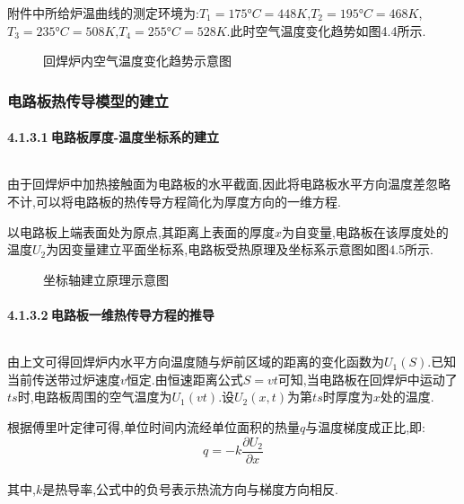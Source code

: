 \documentclass[12pt]{ctexart}
\numberwithin{figure}{section}
\numberwithin{table}{section}
\begin{document}
附件中所给炉温曲线的测定环境为:$T_1=175°C=448K$,$T_2=195°C=468K$,$T_3=235°C=508K$,$T_4=255°C=528K$.此时空气温度变化趋势如图4.4所示.
\begin{figure}[!htp]
\centering
{}
\quad
{}
\caption{回焊炉内空气温度变化趋势示意图}
\end{figure}

\subsubsection{电路板热传导模型的建立}

\paragraph{4.1.3.1$\ $电路板厚度-温度坐标系的建立}$\ $

由于回焊炉中加热接触面为电路板的水平截面,因此将电路板水平方向温度差忽略不计,可以将电路板的热传导方程简化为厚度方向的一维方程.

以电路板上端表面处为原点,其距离上表面的厚度$x$为自变量,电路板在该厚度处的温度$U_2$为因变量建立平面坐标系,电路板受热原理及坐标系示意图如图4.5所示.
\begin{figure}[!htp]
\centering
{}
\quad
{}
\caption{坐标轴建立原理示意图}
\end{figure}

\paragraph{4.1.3.2$\ $电路板一维热传导方程的推导}$\ $

由上文可得回焊炉内水平方向温度随与炉前区域的距离的变化函数为$U_1(S)$.已知当前传送带过炉速度$v$恒定.由恒速距离公式$S=vt$可知,当电路板在回焊炉中运动了$ts$时,电路板周围的空气温度为$U_1(vt)$.设$U_2(x,t)$为第$ts$时厚度为$x$处的温度.

根据傅里叶定律可得,单位时间内流经单位面积的热量$q$与温度梯度成正比,即:
\begin{equation}
q=-k\frac{\partial U_2}{\partial x}
\end{equation}\\
其中,$k$是热导率,公式中的负号表示热流方向与梯度方向相反.
\end{document}

